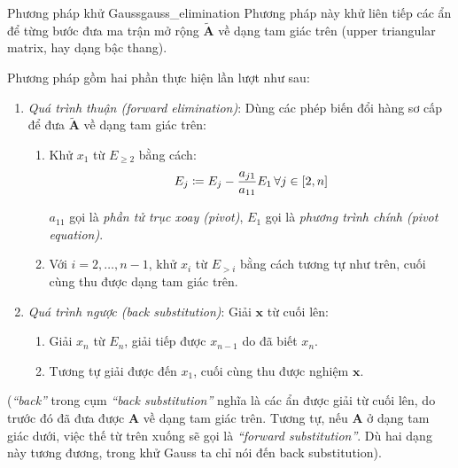 \documentclass[../../Lectures]{subfiles}
\begin{document}
\begin{cmethod}{Phương pháp khử Gauss}{gauss_elimination}
    Phương pháp này khử liên tiếp các ẩn để từng bước đưa ma trận mở rộng
    \(\bm{\tilde{A}}\) về dạng tam giác trên (upper triangular matrix, hay dạng
    bậc thang).

    Phương pháp gồm hai phần thực hiện lần lượt như sau:

    \begin{enumerate}
        \item \emph{Quá trình thuận (forward elimination)}: Dùng các phép biến
            đổi hàng sơ cấp để đưa \(\bm{\tilde{A}}\) về dạng tam giác trên:
            \begin{enumerate}
                \item Khử \(x_1\) từ \(E_{\geq 2}\) bằng cách:
                    \begin{equation}\label{eq:gauss_elinimation_1st}
                        E_j \coloneqq E_j - \frac{a_{j1}}{a_{11}} E_1 \, \forall j \in \interval{2}{n}
                    \end{equation}

                    \(a_{11}\) gọi là \emph{phần tử trục xoay (pivot)}, \(E_1\)
                    gọi là \emph{phương trình chính (pivot equation)}.

                \item Với \(i = 2, \ldots, n - 1\), khử \(x_i\) từ \(E_{> i}\)
                    bằng cách tương tự như trên, cuối cùng thu được dạng tam
                    giác trên.
            \end{enumerate}

        \item \emph{Quá trình ngược (back substitution)}: Giải \(\bm{x}\) từ
            cuối lên:
            \begin{enumerate}
                \item Giải \(x_n\) từ \(E_n\), giải tiếp được \(x_{n - 1}\) do
                    đã biết \(x_n\).

                \item Tương tự giải được đến \(x_1\), cuối cùng thu được nghiệm
                    \(\bm{x}\).
            \end{enumerate}
    \end{enumerate}
\end{cmethod}

(\emph{``back''} trong cụm \emph{``back substitution''} nghĩa là các ẩn được
giải từ cuối lên, do trước đó đã đưa được \(\bm{A}\) về dạng tam giác trên.
Tương tự, nếu \(\bm{A}\) ở dạng tam giác dưới, việc thế từ trên xuống sẽ gọi là
\emph{``forward substitution''}. Dù hai dạng này tương đương, trong khử Gauss ta
chỉ nói đến back substitution).
\end{document}
